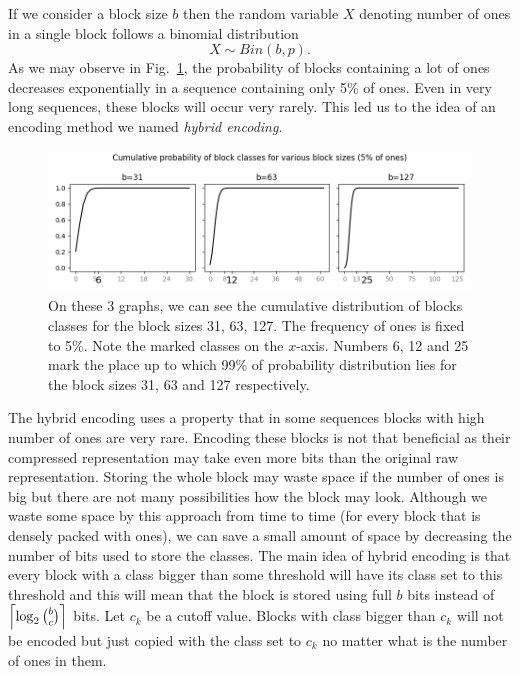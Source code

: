 If we consider a block size $b$ then the random variable $X$ denoting number of
ones in a single block follows a binomial distribution $$X \sim Bin(b, p).$$ As
we may observe in Fig.~\ref{obr:hybridEncodingDistribution}, the probability of
blocks containing a lot of ones decreases exponentially in a sequence containing
only 5\% of ones. Even in very long sequences, these blocks will occur very rarely.
This led us to the idea of an encoding method we named \textit{hybrid encoding}.

\begin{figure}
	\centerline{
		\includegraphics[width=\textwidth]{images/hybrid_encoding_motivation}
	}
	\caption[TODO]{On these 3 graphs, we can see the cumulative distribution
    of blocks classes for the block sizes 31, 63, 127. The frequency of ones is
    fixed to 5\%. Note the marked classes on the $x$-axis. Numbers 6, 12 and
    25 mark the place up to which 99\% of probability distribution lies for
    the block sizes 31, 63 and 127 respectively.
	}
	\label{obr:hybridEncodingDistribution}
\end{figure}

The hybrid encoding uses a property that in some sequences blocks with high number
of ones are very rare. Encoding these blocks is not that beneficial as their
compressed representation may take even more bits than the original raw
representation. Storing the whole block may waste space if the number of
ones is big but there are not many possibilities how the block may look.
Although we waste some space by this approach from time to time (for every
block that is densely packed with ones), we can save a small amount of space
by decreasing the number of bits used to store the classes. The main idea
of hybrid encoding is that every block with a class bigger than some threshold
will have its class set to this threshold and this will mean that the block
is stored using full $b$ bits instead of $\left\lceil \log_2{b\choose c} \right\rceil$ bits.
Let $c_k$ be a cutoff value. Blocks with class bigger than $c_k$ will not be
encoded but just copied with the class set to $c_k$ no matter what is the
number of ones in them.

